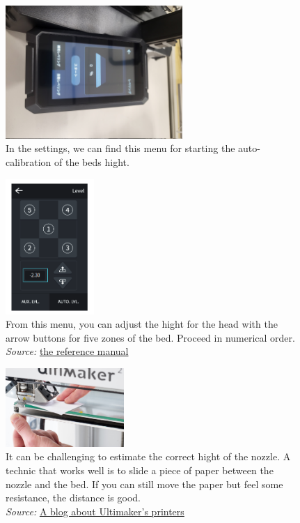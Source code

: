 \documentclass[a4paper,11pt]{article}
\begin{document}
\begin{figure}[H]
    \centering 
    \includegraphics[width=0.6\textwidth]{img/ender/2.jpg} 
    \caption{In the settings, we can find this menu for starting the auto-calibration of the beds hight.}
    \label{fig:ender2}
\end{figure}

\begin{figure}[H]
    \centering 
    \includegraphics[width=0.3\textwidth]{img/ender/3.png} 
    \caption{From this menu, you can adjust the hight for the head with the arrow buttons for five zones of the bed. Proceed in numerical order.\\ \textit{Source:} \href{https://img.staticdj.com/8f39f619af6bf34e5afb36ddbf2a0229.pdf?spm=..page\_1995605.download\_support\_1.1\&spm\_prev=..product\_5e45abfb-4541-4c92-ba93-cfba9a1e3ea4.nav\_link\_store\_1.1}{the reference manual}}
    \label{fig:ender3}
\end{figure}

\begin{figure}[H]
    \centering 
    \includegraphics[width=0.4\textwidth]{img/ender/4.jpg} 
    \caption{It can be challenging to estimate the correct hight of the nozzle. A technic that works well is to slide a piece of paper between the nozzle and the bed. If you can still move the paper but feel some resistance, the distance is good.\\ 
    \textit{Source:} \href{https://blog.discoverthat.co.uk/2015/06/calibrate-3d-printer.html}{A blog about Ultimaker's printers}}
    \label{fig:ender4}
\end{figure}
\end{document}
